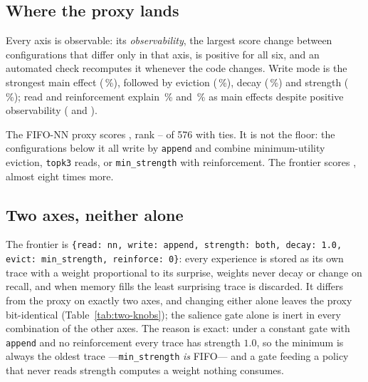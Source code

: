 \documentclass[conference]{IEEEtran}
\begin{document}
\subsection{Where the proxy lands}

Every axis is observable: its \emph{observability}, the largest score change
between configurations that differ only in that axis, is positive for all six,
and an automated check recomputes it whenever the code changes. Write mode is the strongest main effect
(\,\%), followed by
eviction (\,\%), decay
(\,\%) and strength
(\,\%); read and
reinforcement explain
\,\% and
\,\% as main effects
despite positive observability
( and
).

The FIFO-NN proxy scores ,
rank --%
 of 576 with
 ties. It is not the floor:
the configurations below it all write by \texttt{append} and combine
minimum-utility eviction, \texttt{topk3} reads, or \texttt{min\_strength} with
reinforcement. The frontier scores
, almost eight times more.

\subsection{Two axes, neither alone}
\label{sec:interaction}

The frontier is \texttt{\{read: nn, write: append, strength: both, decay: 1.0,
evict: min\_strength, reinforce: 0\}}: every experience is stored as its own
trace with a weight proportional to its surprise, weights never decay or change
on recall, and when memory fills the least surprising trace is discarded. It
differs from the proxy on exactly two axes, and changing either alone leaves the
proxy bit-identical (Table~\ref{tab:two-knobs}); the salience gate alone is
inert in every combination of the other axes. The reason is exact: under a
constant gate with \texttt{append} and no reinforcement every trace has
strength $1.0$, so the minimum is always the oldest trace ---\texttt{min\_strength}
\emph{is} FIFO--- and a gate feeding a policy that never reads strength
computes a weight nothing consumes.
\end{document}
